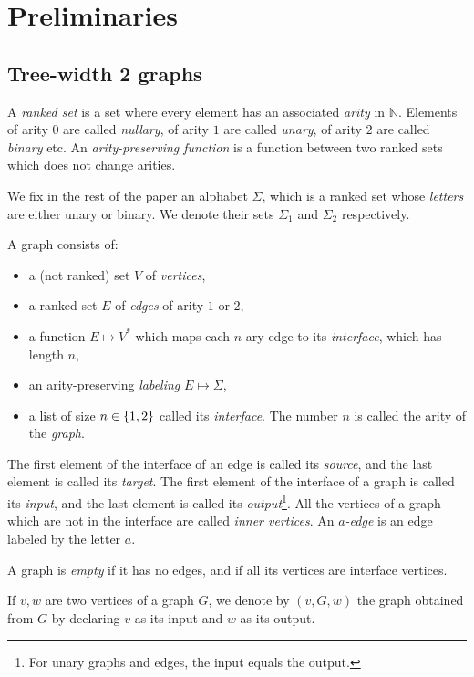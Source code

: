 \section{Preliminaries}\label{sec:prelim}



 
\subsection{Tree-width 2 graphs}

\begin{definition}
A \emph{ranked set} is a set where every element has an associated \emph{arity} in $\mathbb{N}$. Elements of arity $0$ are called \emph{nullary}, of arity $1$ are called \emph{unary}, of arity $2$ are called \emph{binary} etc. An \emph{arity-preserving function} is a function between two ranked sets which does not change arities.
\end{definition}

We fix in the rest of the paper an alphabet $\Sigma$, which is a ranked set whose \emph{letters} are either unary or binary. We denote their sets $\Sigma_1$ and $\Sigma_2$ respectively.

\begin{definition}[Graphs]
 A graph consists of:
\begin{itemize}
\item a (not ranked) set $V$ of \emph{vertices},
\item a ranked set $E$ of \emph{edges} of arity $1$ or $2$,
\item a function $E\mapsto V^*$ which maps each $n$-ary edge to its \emph{interface}, which has length $n$,
\item an arity-preserving \emph{labeling} $E\mapsto \Sigma$,
\item a list of size $n\in\left\{1,2\right\}$ called its \emph{interface}. The number $n$ is called the arity of the \emph{graph}.
\end{itemize} 

The first element of the interface of an edge is called its \emph{source}, and the last element is called its \emph{target}.
The first element of the interface of a graph  is called its \emph{input}, and the last element is called its \emph{output}\footnote{For unary graphs and edges, the input equals the output.}. All the vertices of a graph which are not in the interface are called \emph{inner vertices}. An \emph{$a$-edge} is an edge labeled by the letter $a$.
 
 A  graph is \emph{empty} if it has no edges, and if all its vertices are interface vertices.  
 
 If $v, w$ are two vertices of a graph $G$, we denote by $(v,G,w)$ the graph obtained from $G$ by declaring $v$ as its input and $w$ as its output.
\end{definition}



